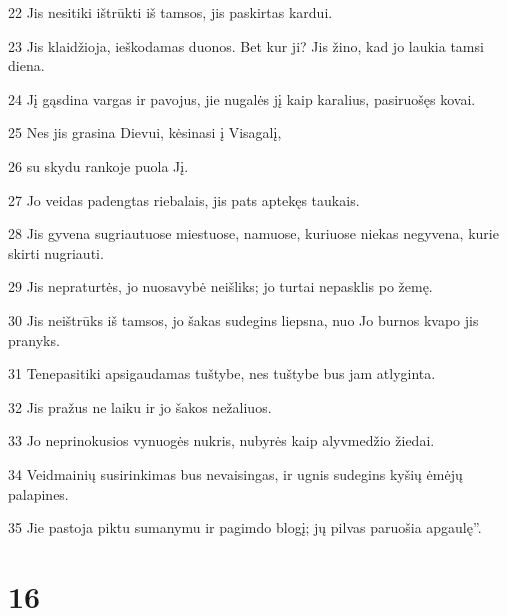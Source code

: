 \par 22 Jis nesitiki ištrūkti iš tamsos, jis paskirtas kardui. 
\par 23 Jis klaidžioja, ieškodamas duonos. Bet kur ji? Jis žino, kad jo laukia tamsi diena. 
\par 24 Jį gąsdina vargas ir pavojus, jie nugalės jį kaip karalius, pasiruošęs kovai. 
\par 25 Nes jis grasina Dievui, kėsinasi į Visagalį, 
\par 26 su skydu rankoje puola Jį. 
\par 27 Jo veidas padengtas riebalais, jis pats aptekęs taukais. 
\par 28 Jis gyvena sugriautuose miestuose, namuose, kuriuose niekas negyvena, kurie skirti nugriauti. 
\par 29 Jis nepraturtės, jo nuosavybė neišliks; jo turtai nepasklis po žemę. 
\par 30 Jis neištrūks iš tamsos, jo šakas sudegins liepsna, nuo Jo burnos kvapo jis pranyks. 
\par 31 Tenepasitiki apsigaudamas tuštybe, nes tuštybe bus jam atlyginta. 
\par 32 Jis pražus ne laiku ir jo šakos nežaliuos. 
\par 33 Jo neprinokusios vynuogės nukris, nubyrės kaip alyvmedžio žiedai. 
\par 34 Veidmainių susirinkimas bus nevaisingas, ir ugnis sudegins kyšių ėmėjų palapines. 
\par 35 Jie pastoja piktu sumanymu ir pagimdo blogį; jų pilvas paruošia apgaulę”.



\chapter{16}


